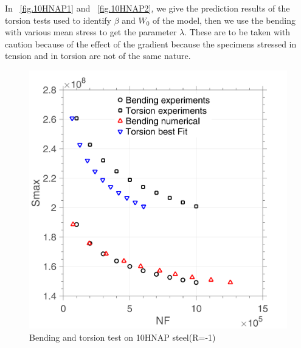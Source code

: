 \documentclass[3p,times,number,review]{elsarticle}
\newcommand{\figref}[1]{\figurename~\ref{#1}}
\begin{document}
In \figref{fig.10HNAP1} and \figref{fig.10HNAP2}, we give the prediction results of the torsion tests used to identify $\beta$ and $W_0$ of the model, then we use the bending with various mean stress to get the parameter $\lambda$. These are to be taken with caution because of the effect of the gradient because the specimens stressed in tension and in torsion are not of the same nature.
\begin{figure}[!h]
	\centering
	\includegraphics[width=\textwidth]{figures//10HNAP_bt1D_sn.png} 
	\caption{Bending and torsion test on 10HNAP steel(R=-1)}
	\label{fig.bt1D10HNAPsn}
\end{figure}
\end{document}
